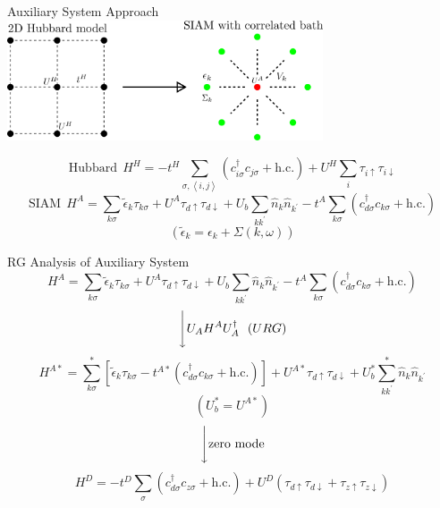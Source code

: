 \documentclass[aspectratio=169]{beamer}
\begin{document}
\begin{frame}{Auxiliary System Approach}
		\centering
		\includegraphics[width=0.7\textwidth]{./cluster-bath.png}

\[\mathrm{Hubbard}~~H^H = -t^H\sum_{\sigma,\left<i,j \right>}\left(c^\dagger_{i\sigma} c_{j\sigma} + \text{h.c.}\right) + U^H\sum_i \tau_{i \uparrow} \tau_{i \downarrow}\]
\[
\mathrm{SIAM}~~H^A = \sum_{k\sigma}\tilde\epsilon_k\tau_{k\sigma} + U^A \tau_{d \uparrow} \tau_{d \downarrow} + U_b \sum_{kk^\prime}\hat n_k \hat n_{k^\prime} -t^A\sum_{k\sigma}\left(c^\dagger_{d\sigma}c_{k\sigma} + \text{h.c.}\right)\]
\[(\tilde{\epsilon}_{k} = \epsilon_{k} + \Sigma (k,\omega)) \]
\end{frame}
\begin{frame}{RG Analysis of Auxiliary System}
	\[H^{A} = \sum_{k\sigma}\tilde\epsilon_k\tau_{k\sigma} + U^{A} \tau_{d \uparrow} \tau_{d \downarrow} + U_b \sum_{kk^\prime}\hat n_k \hat n_{k^\prime} -t^{A}\sum_{k\sigma}\left(c^\dagger_{d\sigma}c_{k\sigma} + \text{h.c.}\right)\]
	\[\Bigg\downarrow U_{A} H^{A} U^{\dagger}_{A}~~(URG)\]
	\[ H ^{A*} = \sum_{k\sigma}^*\left[\tilde\epsilon_k\tau_{k\sigma} -{t}^{A*}\left(c^\dagger_{d\sigma}c_{k\sigma} + \text{h.c.}\right)\right] + U^{A*} \tau_{d \uparrow} \tau_{d \downarrow} + U_{b}^* \sum_{kk^\prime}^*\hat n_k \hat n_{k^\prime} \]
	\[ (U_{b}^{*} = U^{A*}) \]
	\[\Bigg\downarrow \text{zero mode}\]
	\[ H^{D} = -{t}^{D}\sum_{\sigma}\left(c^\dagger_{d\sigma}c_{z\sigma} + \text{h.c.}\right) + U^{D} (\tau_{d \uparrow} \tau_{d \downarrow} + \tau_{z \uparrow} \tau_{z \downarrow}) \]
\end{frame}
\end{document}
